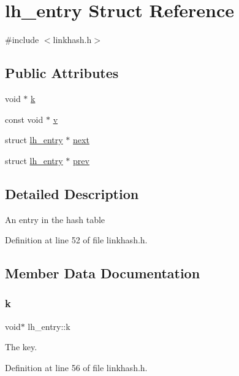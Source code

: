\hypertarget{structlh__entry}{}\section{lh\+\_\+entry Struct Reference}
\label{structlh__entry}


{\ttfamily \#include $<$linkhash.\+h$>$}

\subsection*{Public Attributes}
\begin{DoxyCompactItemize}
\item 
void $\ast$ \hyperlink{structlh__entry_a6b176b3582c9cf553af6431750f5c3b6}{k}
\item 
const void $\ast$ \hyperlink{structlh__entry_a1b676732ab2ad3eeaedf6ec60a6a0835}{v}
\item 
struct \hyperlink{structlh__entry}{lh\+\_\+entry} $\ast$ \hyperlink{structlh__entry_a7c40c46e72d9a0ba071a8d49d535bc67}{next}
\item 
struct \hyperlink{structlh__entry}{lh\+\_\+entry} $\ast$ \hyperlink{structlh__entry_a6fb9c3de01fb5af67d8d429921cc6a3b}{prev}
\end{DoxyCompactItemize}


\subsection{Detailed Description}
An entry in the hash table 

Definition at line 52 of file linkhash.\+h.



\subsection{Member Data Documentation}
\mbox{\label{structlh__entry_a6b176b3582c9cf553af6431750f5c3b6}} 
\subsubsection{\texorpdfstring{k}{k}}
{\footnotesize\ttfamily void$\ast$ lh\+\_\+entry\+::k}

The key. 

Definition at line 56 of file linkhash.\+h.

